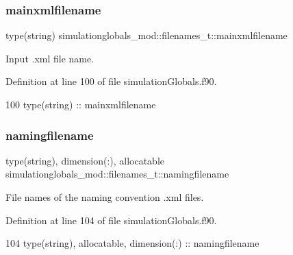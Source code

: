 \subsubsection{\texorpdfstring{mainxmlfilename}{mainxmlfilename}}
{\footnotesize\ttfamily type(string) simulationglobals\+\_\+mod\+::filenames\+\_\+t\+::mainxmlfilename\hspace{0.3cm}{\ttfamily [private]}}



Input .xml file name. 



Definition at line 100 of file simulation\+Globals.\+f90.


\begin{DoxyCode}
100         \textcolor{keywordtype}{type}(string) :: mainxmlfilename
\end{DoxyCode}
\mbox{\label{structsimulationglobals__mod_1_1filenames__t_ab9bfe3490032ac0fe0ff585f4ccf81ba}} 
\subsubsection{\texorpdfstring{namingfilename}{namingfilename}}
{\footnotesize\ttfamily type(string), dimension(\+:), allocatable simulationglobals\+\_\+mod\+::filenames\+\_\+t\+::namingfilename\hspace{0.3cm}{\ttfamily [private]}}



File names of the naming convention .xml files. 



Definition at line 104 of file simulation\+Globals.\+f90.


\begin{DoxyCode}
104         \textcolor{keywordtype}{type}(string), \textcolor{keywordtype}{allocatable}, \textcolor{keywordtype}{dimension(:)} :: namingfilename
\end{DoxyCode}
\mbox{\label{structsimulationglobals__mod_1_1filenames__t_aa8af9fb10dcd5d2f5dfc0fe299a16755}} 
